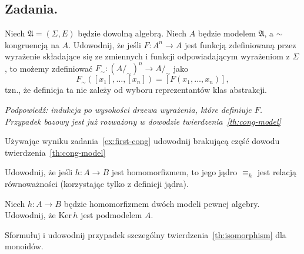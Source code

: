 \subsection{Zadania.}

\begin{exercise}\label{ex:first-cong}
	Niech $\mathfrak{A} = (\Sigma, E)$ będzie dowolną algebrą.
	Niech $A$ będzie modelem $\mathfrak{A}$,
		a $\sim$ kongruencją na $A$.
	Udowodnij,
		że jeśli $F: A^n \to A$ jest funkcją zdefiniowaną przez wyrażenie składające się
		ze zmiennych i funkcji odpowiadającym wyrażeniom z $\Sigma$,
		to możemy zdefiniować $F_\sim : (A/_\sim)^n \to A/_\sim$ jako
	\begin{equation}
		F_\sim([x_1], \dots, [x_n]) = [F(x_1, \dots, x_n)],
	\end{equation}
		tzn., że definicja ta nie zależy od wyboru reprezentantów klas abstrakcji.

	\textit{Podpowiedź: indukcja po wysokości drzewa wyrażenia, które definiuje $F$.
	Przypadek bazowy jest już rozważony w dowodzie twierdzenia~\ref{th:cong-model}}
\end{exercise}

\begin{exercise}\label{ex:last-cong}
	Używając wyniku zadania~\ref{ex:first-cong} udowodnij brakującą część dowodu twierdzenia~\ref{th:cong-model}
\end{exercise}

\begin{exercise}\label{ex:ker-equiv}
	Udowodnij,
		że jeśli $h: A \to B$ jest homomorfizmem,
		to jego jądro $\equiv_h$ jest relacją równoważności
		(korzystając tylko z definicji jądra).
\end{exercise}

\begin{exercise}\label{ex:ker-submodel}
	Niech $h: A \to B$ będzie homomorfizmem dwóch modeli pewnej algebry.
	Udowodnij, że $\mathrm{Ker}\,h$ jest podmodelem $A$.
\end{exercise}

\begin{exercise}
	Sformułuj i udowodnij przypadek szczególny twierdzenia~\ref{th:isomorphism} dla monoidów.
\end{exercise}

